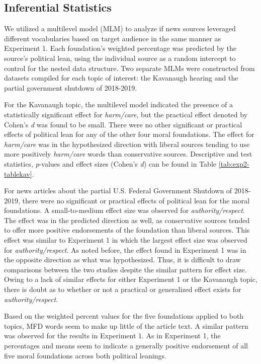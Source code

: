 \documentclass[
  english,
  man]{apa6}
\begin{document}
\hypertarget{inferential-statistics-1}{%
\subsection{Inferential Statistics}\label{inferential-statistics-1}}

We utilized a multilevel model (MLM) to analyze if news sources leveraged different vocabularies based on target audience in the same manner as Experiment 1. Each foundation's weighted percentage was predicted by the source's political lean, using the individual source as a random intercept to control for the nested data structure. Two separate MLMs were constructed from datasets compiled for each topic of interest: the Kavanaugh hearing and the partial government shutdown of 2018-2019.

For the Kavanaugh topic, the multilevel model indicated the presence of a statistically significant effect for \emph{harm/care}, but the practical effect denoted by Cohen's \emph{d} was found to be small. There were no other significant or practical effects of political lean for any of the other four moral foundations. The effect for \emph{harm/care} was in the hypothesized direction with liberal sources tending to use more positively \emph{harm/care} words than conservative sources. Descriptive and test statistics, \emph{p}-values and effect sizes (Cohen's \emph{d}) can be found in Table \ref{tab:exp2-tablekav}.

For news articles about the partial U.S. Federal Government Shutdown of 2018-2019, there were no significant or practical effects of political lean for the moral foundations. A small-to-medium effect size was observed for \emph{authority/respect}. The effect was in the predicted direction as well, as conservative sources tended to offer more positive endorsements of the foundation than liberal sources. This effect was similar to Experiment 1 in which the largest effect size was observed for \emph{authority/respect}. As noted before, the effect found in Experiment 1 was in the opposite direction as what was hypothesized. Thus, it is difficult to draw comparisons between the two studies despite the similar pattern for effect size. Owing to a lack of similar effects for either Experiment 1 or the Kavanaugh topic, there is doubt as to whether or not a practical or generalized effect exists for \emph{authority/respect}.

Based on the weighted percent values for the five foundations applied to both topics, MFD words seem to make up little of the article text. A similar pattern was observed for the results in Experiment 1. As in Experiment 1, the percentages and means seem to indicate a generally positive endorsement of all five moral foundations across both political leanings.
\end{document}
